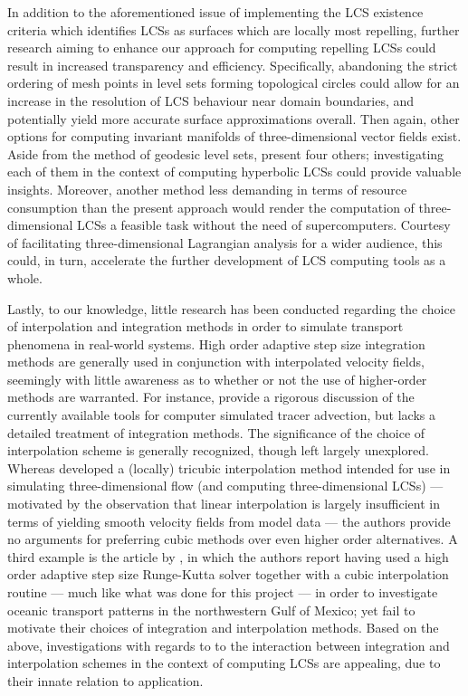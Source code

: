 In addition to the aforementioned issue of implementing the LCS existence
criteria which identifies LCSs as surfaces which are locally most repelling,
further research aiming to enhance our approach for computing repelling LCSs
could result in increased transparency and efficiency. Specifically,
abandoning the strict ordering of mesh points in level sets forming topological
circles could allow for an increase in the resolution of LCS behaviour near
domain boundaries, and potentially yield more accurate surface approximations
overall. Then again, other options for computing invariant manifolds of
three-dimensional vector fields exist. Aside from the method of geodesic level
sets, \textcite{krauskopf2005survey} present four others; investigating each of
them in the context of computing hyperbolic LCSs could provide valuable
insights. Moreover, another method less demanding in terms of resource
consumption than the present approach would render the computation of
three-dimensional LCSs a feasible task without the need of supercomputers.
Courtesy of facilitating three-dimensional Lagrangian analysis for a wider
audience, this could, in turn, accelerate the further development of LCS
computing tools as a whole.

Lastly, to our knowledge, little research has been conducted regarding the
choice of interpolation and integration methods in order to simulate transport
phenomena in real-world systems. High order adaptive step size integration
methods are generally used in conjunction with interpolated velocity fields,
seemingly with little awareness as to whether or not the use of higher-order
methods are warranted. For instance, \textcite{vansebille2018lagrangian}
provide a rigorous discussion of the currently available tools for computer
simulated tracer advection, but lacks a detailed treatment of integration
methods. The significance of the choice of interpolation scheme is generally
recognized, though left largely unexplored. Whereas
\textcite{lekien2005tricubic} developed a (locally) tricubic interpolation
method intended for use in simulating three-dimensional flow (and computing
three-dimensional LCSs) --- motivated by the observation that linear
interpolation is largely insufficient in terms of yielding smooth velocity
fields from model data --- the authors provide no arguments for preferring
cubic methods over even higher order alternatives. A third example is the
article by \textcite{gough2017persistent}, in which the authors report having
used a high order adaptive step size Runge-Kutta solver together with a cubic
interpolation routine --- much like what was done for this project --- in order
to investigate oceanic transport patterns in the northwestern Gulf of Mexico;
yet fail to motivate their choices of integration and interpolation methods.
Based on the above, investigations with regards to to the interaction between
integration and interpolation schemes in the context of computing LCSs are
appealing, due to their innate relation to application.

